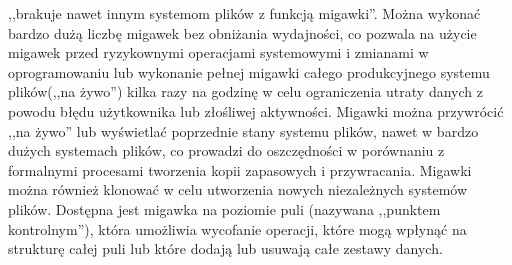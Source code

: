 \documentclass[12pt,a4paper]{article}
\begin{document}
			,,brakuje nawet innym systemom plików z funkcją migawki''. Można wykonać bardzo dużą liczbę migawek bez obniżania wydajności, co pozwala na użycie migawek przed
			ryzykownymi operacjami systemowymi i zmianami w oprogramowaniu lub wykonanie pełnej migawki całego produkcyjnego systemu plików(,,na żywo'') kilka razy na godzinę w celu
			ograniczenia utraty danych z powodu błędu użytkownika lub złośliwej aktywności. Migawki można przywrócić ,,na żywo'' lub wyświetlać poprzednie stany systemu plików, nawet
			w bardzo dużych systemach plików, co prowadzi do oszczędności w porównaniu z formalnymi procesami tworzenia kopii zapasowych i przywracania. Migawki można również klonować
			w celu utworzenia nowych niezależnych systemów plików. Dostępna jest migawka na poziomie puli (nazywana ,,punktem kontrolnym''), która umożliwia wycofanie operacji, które mogą
			wpłynąć na strukturę całej puli lub które dodają lub usuwają całe zestawy danych.
			
	\newpage
	
\end{document}
